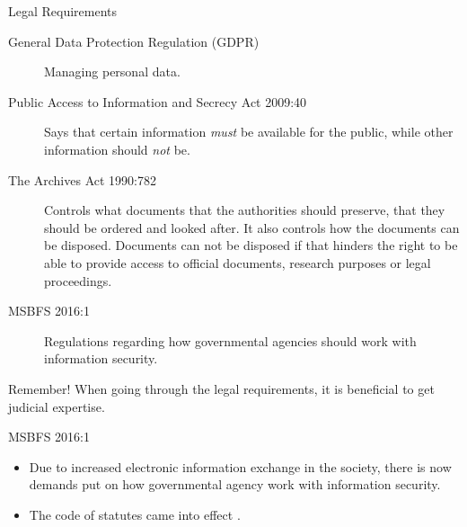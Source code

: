 \documentclass{beamer}
\begin{document}
\begin{frame}{Legal Requirements}
  \begin{description}
    \item[General Data Protection Regulation (GDPR)] Managing personal data.

    \item[Public Access to Information and Secrecy Act 2009:40] Says that
      certain information \emph{must} be available for the public, while other
      information should \emph{not} be.

    \item[The Archives Act 1990:782] Controls what documents that the
      authorities should preserve, that they should be ordered and looked after.
			It also controls how the documents can be disposed. Documents can not be
			disposed if that hinders the right to be able to provide access to official
			documents, research purposes or legal proceedings.
    \item[MSBFS 2016:1] Regulations regarding how governmental agencies should
      work with information security.
  \end{description}
  \begin{block}{Remember!}
    When going through the legal requirements, it is beneficial to get judicial
    expertise.
  \end{block}
\end{frame}
\begin{frame}{MSBFS 2016:1}
  \begin{itemize}
    \item Due to increased electronic information exchange in the society, there
      is now demands put on how governmental agency work with information
      security.
    \item The code of statutes came into effect .
  \end{itemize}
\end{frame}
\end{document}
